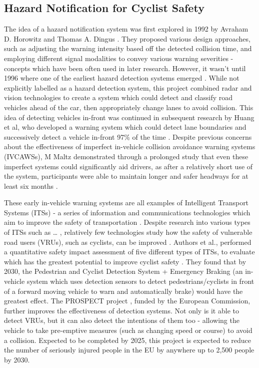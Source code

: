 \documentclass{interim}
\begin{document}
\subsection{Hazard Notification for Cyclist Safety}
The idea of a hazard notification system was first explored in 1992 by Avraham D. Horowitz and Thomas A. Dingus \cite{doi:10.1177/154193129203601320}. They proposed various design approaches, such as adjusting the warning intensity based off the detected collision time, and employing different signal modalities to convey various warning severities - concepts which have been often used in later research. However, it wasn’t until 1996 where one of the earliest hazard detection systems emerged \cite{566402}. While not explicitly labelled as a hazard detection system, this project combined radar and vision technologies to create a system which could detect and classify road vehicles ahead of the car, then appropriately change lanes to avoid collision. This idea of detecting vehicles in-front was continued in subsequent research by Huang et al, who developed a warning system which could detect lane boundaries and successively detect a vehicle in-front 97\% of the time \cite{1307429}. Despite previous concerns about the effectiveness of imperfect in-vehicle collision avoidance warning systems (IVCAWSs), M Maltz demonstrated through a prolonged study that even these imperfect systems could significantly aid drivers, as after a relatively short use of the system, participants were able to maintain longer and safer headways for at least six months \cite{doi:10.1518/0018720024497925, doi:10.1518/hfes.46.2.357.37348}.

These early in-vehicle warning systems are all examples of Intelligent Transport Systems (ITSs) - a series of information and communications technologies which aim to improve the safety of transportation \cite{its}. Despite research into various types of ITSs such as … , relatively few technologies study how the safety of vulnerable road users (VRUs), such as cyclists, can be improved \cite{Scholliers2017}. Authors et al., performed a quantitative safety impact assessment of five different types of ITSs, to evaluate which has the greatest potential to improve cyclist safety \cite{silla2017can}. They found that by 2030, the Pedestrian and Cyclist Detection System + Emergency Braking (an in-vehicle system which uses detection sensors to detect pedestrians/cyclists in front of a forward moving vehicle to warn and automatically brake) would have the greatest effect. The PROSPECT project \cite{cieslik2019improving}, funded by the European Commission, further improves the effectiveness of detection systems. Not only is it able to detect VRUs, but it can also detect the intentions of them too - allowing the vehicle to take pre-emptive measures (such as changing speed or course) to avoid a collision. Expected to be completed by 2025, this project is expected to reduce the number of seriously injured people in the EU by anywhere up to 2,500 people by 2030.
\end{document}

